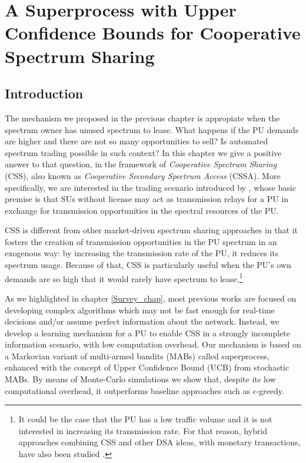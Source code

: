 \graphicspath{ {img/MAB_CSSA/} }
\chapter[A Superprocess with Upper Confidence Bounds for Cooperative Spectrum Sharing][A Superprocess with UCB for CSS]{A Superprocess with Upper Confidence Bounds for Cooperative Spectrum Sharing}\label{MAB_CSSA_chap}

\section{Introduction}
The mechanism we proposed in the previous chapter is appropiate when the spectrum owner has unused spectrum to lease. What happens if the PU demands are higher and there are not so many opportunities to sell? Is automated spectrum trading possible in such context? In this chapter we give a positive answer to that question, in the framework of \textit{Cooperative Spectrum Sharing} (CSS), also known as \textit{Cooperative Secondary Spectrum Access} (CSSA). 
More specifically, we are interested in the trading scenario introduced by \cite{ref:Simeone2008}, whose basic premise is that SUs without license may act as transmission relays for a PU in exchange for transmission opportunities in the spectral resources of the PU.

CSS is different from other market-driven spectrum sharing approaches in that it fosters the creation of transmission opportunities in the PU spectrum in an exogenous way: by increasing the transmission rate of the PU, it reduces its spectrum usage. 
Because of that, CSS is particularly useful when the PU's own demands are so high that it would rarely have spectrum to lease.\footnote{It could be the case that the PU has a low traffic volume and it is not interested in increasing its transmission rate. 
For that reason, hybrid approaches combining CSS and other DSA ideas, with monetary transactions, have also been studied \cite{ref:Zhang2009,ref:Zhang2012_Fair}.}

As we highlighted in chapter \ref{Survey_chap}, most previous works are focused on developing complex algorithms which may not be fast enough for real-time decisions and/or assume perfect information about the network. Instead, we develop a learning mechanism for a PU to enable CSS in a strongly incomplete information scenario, with low computation overhead. Our mechanism is based on a Markovian variant of multi-armed bandits (MABs) called superprocess, enhanced with the concept of Upper Confidence Bound (UCB) from stochastic MABs. By means of Monte-Carlo simulations we show that, despite its low computational overhead, it outperforms baseline approaches such as $\epsilon$-greedy.

